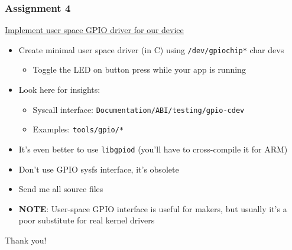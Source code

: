 \begin{frame}
  \frametitle{Assignment 4}
  \underline{Implement user space GPIO driver for our device}
  \begin{itemize}
    \item Create minimal user space driver (in C) using
          \texttt{/dev/gpiochip*} char devs
      \begin{itemize}
        \item Toggle the LED on button press while your app is running
      \end{itemize}
    \item Look here for insights:
      \begin{itemize}
        \item Syscall interface: \texttt{Documentation/ABI/testing/gpio-cdev}
        \item Examples: \texttt{tools/gpio/*}
      \end{itemize}
    \item It's even better to use \texttt{libgpiod} (you'll have to
          cross-compile it for ARM)
    \item \alert{Don't use GPIO sysfs interface, it's obsolete}
    \item Send me all source files
    \item \textbf{NOTE}: User-space GPIO interface is useful for makers, but
          usually it's a poor substitute for real kernel drivers
  \end{itemize}
\end{frame}

\begin{frame}[standout]
  Thank you!
\end{frame}


